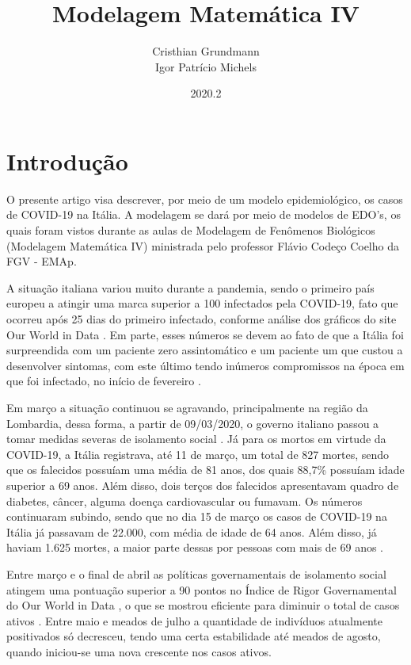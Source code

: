 \documentclass{article}
\title{Modelagem Matemática IV}
\author{Cristhian Grundmann \\
	Igor Patrício Michels}
\date{2020.2}
\begin{document}
	
	\maketitle
	
	\section{Introdução}
	
	O presente artigo visa descrever, por meio de um modelo epidemiológico, os casos de COVID-19 na Itália. A modelagem se dará por meio de modelos de EDO's, os quais foram vistos durante as aulas de Modelagem de Fenômenos Biológicos (Modelagem Matemática IV) ministrada pelo professor Flávio Codeço Coelho da FGV - EMAp.
	
	A situação italiana variou muito durante a pandemia, sendo o primeiro país europeu a atingir uma marca superior a 100 infectados pela COVID-19, fato que ocorreu após 25 dias do primeiro infectado, conforme análise dos gráficos do site Our World in Data \cite{owid}. Em parte, esses números se devem ao fato de que a Itália foi surpreendida com um paciente zero assintomático e um paciente um que custou a desenvolver sintomas, com este último tendo inúmeros compromissos na época em que foi infectado, no início de fevereiro \cite{dn}\cite{cm}.
	
	Em março a situação continuou se agravando, principalmente na região da Lombardia, dessa forma, a partir de 09/03/2020, o governo italiano passou a tomar medidas severas de isolamento social \cite{piccolomini}. Já para os mortos em virtude da COVID-19, a Itália registrava, até 11 de março, um total de 827 mortes, sendo que os falecidos possuíam uma média de 81 anos, dos quais 88,7\% possuíam idade superior a 69 anos. Além disso, dois terços dos falecidos apresentavam quadro de diabetes, câncer, alguma doença cardiovascular ou fumavam. Os números continuaram subindo, sendo que no dia 15 de março os casos de COVID-19 na Itália já passavam de 22.000, com média de idade de 64 anos. Além disso, já haviam 1.625 mortes, a maior parte dessas por pessoas com mais de 69 anos \cite{REMUZZI20201225}\cite{10.1001/jama.2020.4344}.
	
	Entre março e o final de abril as políticas governamentais de isolamento social atingem uma pontuação superior a 90 pontos no Índice de Rigor Governamental do Our World in Data \cite{owid}, o que se mostrou eficiente para diminuir o total de casos ativos \cite{italia}. Entre maio e meados de julho a quantidade de indivíduos atualmente positivados só decresceu, tendo uma certa estabilidade até meados de agosto, quando iniciou-se uma nova crescente nos casos ativos.
	
\end{document}
